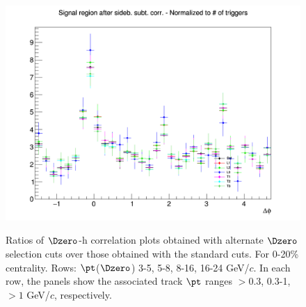 \begin{figure}
{\includegraphics[width=0.31\linewidth]{figuresVsCent/Dzero/SystDcuts/0_20/AzimCorrDistr_Dzero_Canvas_PtIntBins12to12_PoolInt_thr1to99_Superimp.png}} \\
 \caption{Ratios of $\Dzero$-h correlation plots obtained with alternate $\Dzero$ selection cuts over those obtained with the standard cuts. For 0-20\% centrality. Rows: $\pt$($\Dzero$) 3-5, 5-8, 8-16, 16-24 GeV/$c$. In each row, the panels show the associated track
$\pt$ ranges $> 0.3$, 0.3-1, $> 1$ GeV/$c$, respectively.}
\label{fig:SysDcut020}
\end{figure}
